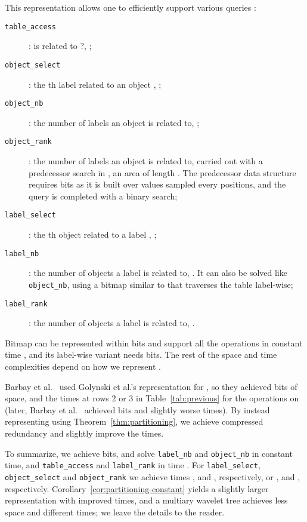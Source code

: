 \documentclass[11pt]{article}
\begin{document}
\begin{table}[t]
{\begin{tabular}
This representation allows one to efficiently support various queries 
\cite{BGMR07}:
\begin{description}
\item[{\tt table\_access}]:
is  related to ?,
	;
\item[{\tt object\_select}]:
the th label related to an object , 
	; 
\item[{\tt object\_nb}]:
the number of labels an object  is related to, 
	; 
\item[{\tt object\_rank}]:
the number of labels  an object  is related to,
	carried out with a predecessor search in 
        , an
        area of length .
	The predecessor data structure requires  bits as it
        is built over values sampled every  positions, and the
	query is completed with a binary search;
\item[{\tt label\_select}]:
the th object related to a label , 
	;
\item[{\tt label\_nb}]:
the number of objects a label  is related to,
	. It can also be solved like {\tt object\_nb},
        using a bitmap similar to  that traverses the table label-wise;
\item[{\tt label\_rank}]:
the number of objects  a label  is related to,
	. 
\end{description}

Bitmap  can be represented within  bits and support all the operations in constant time 
\cite{RRR02}, and its label-wise variant needs  bits.
The rest of the space and time complexities depend on how we represent .

Barbay et al.~\cite{BGMR07} used Golynski et al.'s representation for 
\cite{GMR06}, so they achieved  bits of space,
and the times at rows 2 or 3 in Table~\ref{tab:previous} for the
operations on  (later, Barbay et al.~\cite{BHMR07} achieved  bits and slightly worse times).
By instead representing  using Theorem~\ref{thm:partitioning},
we achieve compressed redundancy and slightly improve the times. 

To summarize, we achieve  bits, and solve 
{\tt label\_nb} and {\tt object\_nb} in constant
time, and {\tt table\_access} and {\tt label\_rank} in time .
For {\tt label\_select}, {\tt object\_select} and {\tt object\_rank} we
achieve times ,  and , 
respectively, or ,  and , 
respectively. Corollary~\ref{cor:partitioning-constant} yields a slightly
larger representation with improved times, and a multiary wavelet tree
\cite[Thm.~4]{GRR08} achieves less space and different times; we leave the 
details to the reader.


\end{tabular}}
\end{table}
\end{document}
